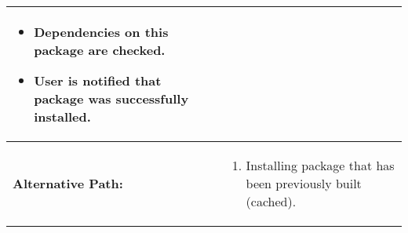 \begin{tabularx}{\linewidth}{|l|X|}
\begin{minipage}{\linewidth}
\begin{itemize}
    \item Dependencies on this package are checked.
    \item User is notified that package was successfully installed.
  \end{itemize}
  \vspace{0.05em}
\end{minipage}
\\
\hline 
\textbf{Alternative Path:} &
\begin{minipage}{\linewidth}
  \vspace{0.05em} 
  \begin{enumerate}
    \item Installing package that has been previously built (cached).
  \end{enumerate}
  \vspace{0.05em} 
\end{minipage}
\\
\hline
\end{tabularx}

\newpage



